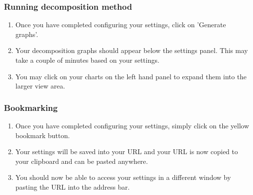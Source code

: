 \subsubsection{Running decomposition method}
\begin{enumerate}
\item Once you have completed configuring your settings, click on 'Generate graphs'.
\item Your decomposition graphs should appear below the settings panel. This may take a couple of minutes based on your settings.
\item You may click on your charts on the left hand panel to expand them into the larger view area.
\end{enumerate}

\subsubsection{Bookmarking}
\begin{enumerate}
\item Once you have completed configuring your settings, simply click on the yellow bookmark button.
\item Your settings will be saved into your URL and your URL is now copied to your clipboard and can be pasted anywhere.
\item You should now be able to access your settings in a different window by pasting the URL into the address bar.
\end{enumerate}
